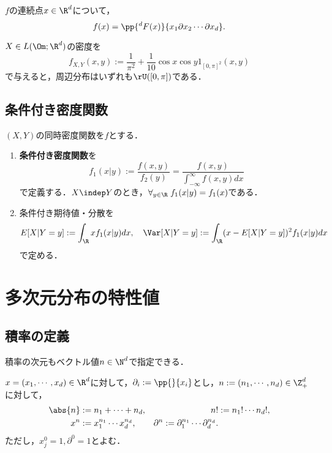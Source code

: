 \documentclass[uplatex,dvipdfmx]{jsreport}
\begin{document}
\begin{lemma}
    $f$の連続点$x\in\R^d$について，
    \[f(x)=\pp{^dF(x)}{x_1\partial x_2\cdots\partial x_d}.\]
\end{lemma}

\begin{example}
    $X\in L(\Om;\R^d)$の密度を
    \[f_{X,Y}(x,y):=\frac{1}{\pi^2}+\frac{1}{10}\cos x\cos y1_{[0,\pi]^2}(x,y)\]
    で与えると，周辺分布はいずれも$\rU([0,\pi])$である．
\end{example}

\subsection{条件付き密度関数}

\begin{definition}
    $(X,Y)$の同時密度関数を$f$とする．
    \begin{enumerate}
        \item \textbf{条件付き密度関数}を
        \[f_1(x|y):=\frac{f(x,y)}{f_2(y)}=\frac{f(x,y)}{\int^\infty_{-\infty}f(x,y)dx}\]
        で定義する．$X\indep Y$のとき，$\forall_{y\in\R}\;f_1(x|y)=f_1(x)$である．
        \item 条件付き期待値・分散を
        \[E[X|Y=y]:=\int_\R xf_1(x|y)dx,\quad\Var[X|Y=y]:=\int_\R(x-E[X|Y=y])^2f_1(x|y)dx\]
        で定める．
    \end{enumerate}
\end{definition}

\section{多次元分布の特性値}

\subsection{積率の定義}

\begin{tcolorbox}[colframe=ForestGreen, colback=ForestGreen!10!white,breakable,colbacktitle=ForestGreen!40!white,coltitle=black,fonttitle=\bfseries\sffamily,
    title=]
    積率の次元もベクトル値$n\in\N^d$で指定できる．
\end{tcolorbox}

\begin{notation}
    $x=(x_1,\cdots,x_d)\in\R^d$に対して，$\partial_i:=\pp{}{x_i}$とし，$n:=(n_1,\cdots,n_d)\in\Z^d_+$に対して，
    \begin{align*}
        \abs{n}&:=n_1+\cdots+n_d,&n!&:=n_1!\cdots n_d!,\\
        x^n&:=x_1^{n_1}\cdots x_d^{n_d},&\partial^n:=\partial_1^{n_1}\cdots\partial_d^{n_d}.
    \end{align*}
    ただし，$x^0_j=1,\partial^0=1$とよむ．
\end{notation}
\end{document}
